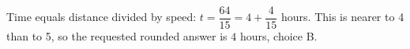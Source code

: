Time equals distance divided by speed: $t=\dfrac{64}{15}=4+\dfrac{4}{15}$ hours. This is nearer to 4 than to 5, so the requested rounded answer is $\boxed4$ hours, choice B.
